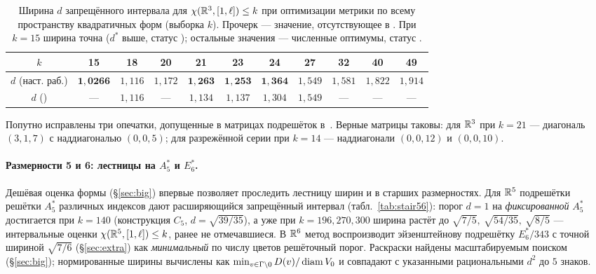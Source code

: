 \begin{table}[h]
\centering
\caption{Ширина $d$ запрещённого интервала для $\chi(\mathbb{R}^3,[1,\ell])\le k$ при
оптимизации метрики по всему пространству квадратичных форм (выборка $k$).
Прочерк --- значение, отсутствующее в \cite{Ivanov2011}. При $k=15$ ширина
точна ($d^*$ выше, статус \stC); остальные значения --- численные оптимумы,
статус \stN.}
\label{tab:r3}
\small
\begin{tabular}{c cccccccccc}
\toprule
$k$ & 15 & 18 & 20 & 21 & 23 & 24 & 27 & 32 & 40 & 49\\
\midrule
$d$ (наст. раб.) & $\mathbf{1{,}0266}$ & $1{,}116$ & $1{,}172$ & $\mathbf{1{,}263}$
  & $\mathbf{1{,}253}$ & $\mathbf{1{,}364}$ & $1{,}549$ & $1{,}581$ & $1{,}822$
  & $1{,}914$\\
$d$ (\cite{Ivanov2011}) & --- & $1{,}116$ & --- & $1{,}134$ & $1{,}137$ &
  $1{,}304$ & $1{,}549$ & --- & --- & ---\\
\bottomrule
\end{tabular}
\end{table}

\noindent Попутно исправлены три опечатки, допущенные в матрицах подрешёток
в~\cite{Ivanov2011}. Верные матрицы таковы: для $\mathbb{R}^3$ при $k=21$ ---
диагональ $(3,1,7)$ с наддиагональю $(0,0,5)$; для разрежённой серии при $k=14$
--- наддиагонали $(0,0,12)$ и $(0,0,10)$.

\paragraph{Размерности 5 и 6: лестницы на $A_5^*$ и $E_6^*$.} Дешёвая оценка
формы (\S\ref{sec:big}) впервые позволяет проследить лестницу ширин и в старших
размерностях. Для $\mathbb{R}^5$ подрешётки решётки $A_5^*$ различных индексов дают
расширяющийся запрещённый интервал (табл.~\ref{tab:stair56}): порог $d=1$
на \emph{фиксированной} $A_5^*$ достигается при $k=140$ (конструкция $C_5$,
$d=\sqrt{39/35}$), а уже при
$k=196,270,300$ ширина растёт до $\sqrt{7/5},\ \sqrt{54/35},\ \sqrt{8/5}$ ---
интервальные оценки $\chi(\mathbb{R}^5,[1,\ell])\le k$, ранее не отмечавшиеся. В $\mathbb{R}^6$
метод воспроизводит эйзенштейнову подрешётку $E_6^*/343$ с точной шириной
$\sqrt{7/6}$ (\S\ref{sec:extra}) как \emph{минимальный} по числу цветов
решёточный порог. Раскраски найдены масштабируемым поиском
(\S\ref{sec:big}); нормированные ширины вычислены как $\min_{v\in\Gamma\setminus0}
D(v)/\operatorname{diam} V_0$ и совпадают с указанными рациональными $d^2$ до $5$ знаков.

